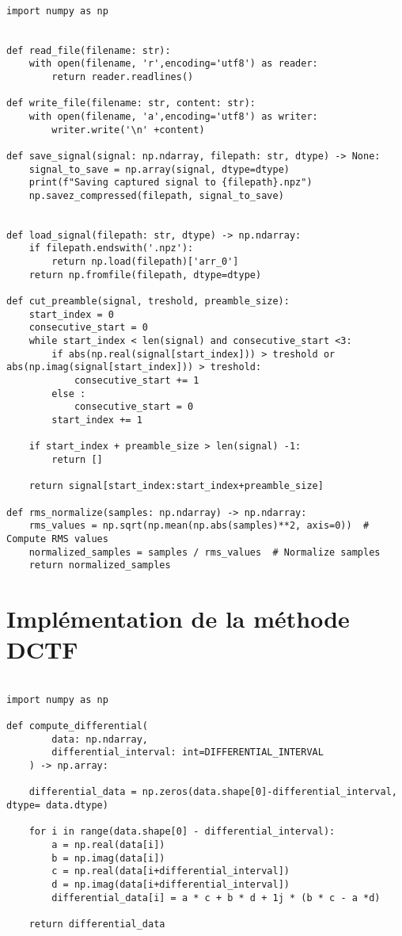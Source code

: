 \begin{lstlisting}[style=pythonstyle, caption={Preprocessing}, label={lst:python}]

import numpy as np


def read_file(filename: str):
    with open(filename, 'r',encoding='utf8') as reader:
        return reader.readlines()

def write_file(filename: str, content: str):
    with open(filename, 'a',encoding='utf8') as writer:
        writer.write('\n' +content)
        
def save_signal(signal: np.ndarray, filepath: str, dtype) -> None:
    signal_to_save = np.array(signal, dtype=dtype)
    print(f"Saving captured signal to {filepath}.npz")
    np.savez_compressed(filepath, signal_to_save)


def load_signal(filepath: str, dtype) -> np.ndarray:
    if filepath.endswith('.npz'):
        return np.load(filepath)['arr_0']
    return np.fromfile(filepath, dtype=dtype)
    
def cut_preamble(signal, treshold, preamble_size):
    start_index = 0
    consecutive_start = 0
    while start_index < len(signal) and consecutive_start <3:
        if abs(np.real(signal[start_index])) > treshold or abs(np.imag(signal[start_index])) > treshold:
            consecutive_start += 1
        else :
            consecutive_start = 0
        start_index += 1

    if start_index + preamble_size > len(signal) -1:
        return []

    return signal[start_index:start_index+preamble_size]

def rms_normalize(samples: np.ndarray) -> np.ndarray:
    rms_values = np.sqrt(np.mean(np.abs(samples)**2, axis=0))  # Compute RMS values
    normalized_samples = samples / rms_values  # Normalize samples
    return normalized_samples
\end{lstlisting}

\section{Implémentation de la méthode DCTF}\label{codeDCTF}

\begin{lstlisting}[style=pythonstyle, caption={Méthode DCTF}, label={lst:python}]

import numpy as np

def compute_differential(
        data: np.ndarray,
        differential_interval: int=DIFFERENTIAL_INTERVAL
    ) -> np.array:

    differential_data = np.zeros(data.shape[0]-differential_interval, dtype= data.dtype)

    for i in range(data.shape[0] - differential_interval):
        a = np.real(data[i])
        b = np.imag(data[i])
        c = np.real(data[i+differential_interval])
        d = np.imag(data[i+differential_interval])
        differential_data[i] = a * c + b * d + 1j * (b * c - a *d)

    return differential_data

\end{lstlisting}